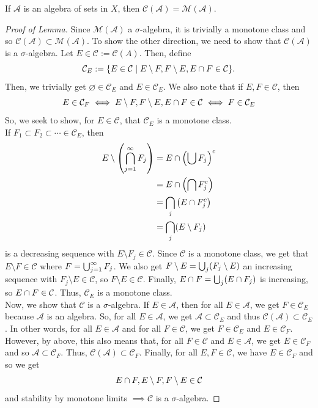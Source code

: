 \documentclass[11pt,leqno,oneside]{amsbook}
\numberwithin{thm}{section}
\renewcommand{\A}{\mathcal{A}} %
\newcommand{\M}{\mathcal{M}} %
\newcommand{\cC}{\mathcal{C}} %
\newcommand{\s}{$\sigma$-} %
\renewcommand{\emptyset}{\varnothing}
\begin{document}
\begin{lem}
  If \(\A\) is an algebra of sets in \(X\), then \(\cC(\A) = \M(\A)\).
\end{lem}
\begin{proof}[Proof of Lemma]
  Since \(\M(\A)\) a \s algebra, it is trivially a monotone class and
  so \(\cC(\A) \subset \M(\A)\). To show the other direction, we need
  to show that \(\cC(\A)\) is a \s algebra. Let \(E \in \cC :=
  \cC(A)\). Then, define \[
    \cC_E := \{E \in \cC \st E \setminus F, F \setminus E, E
    \intersect F \in \cC\}.
  \]
  Then, we trivially get \(\emptyset \in \cC_E\) and \(E \in
  \cC_E\). We also note that if \(E,F \in \cC\), then \[
    E \in \cC_F \iff E \setminus F, F \setminus E, E \intersect F \in
    \cC \iff F \in \cC_E
  \]
  So, we seek to show, for \(E \in \cC\), that \(\cC_E\) is a monotone
  class. \\

  If \(F_1 \subset F_2 \subset \cdots \in \cC_E\), then
  \begin{align*}
    E \setminus \left( \bigcap_{j=1}^\infty F_j \right)
    & = E \cap \left( \bigcup F_j \right)^c \\
    & = E \cap \left( \bigcap F_j^c \right) \\
    & = \bigcap_j \left( E \cap F_j^c \right) \\
    & = \bigcap_j (E \setminus F_j)
  \end{align*}
  is a decreasing sequence with \(E \setminus F_j \in \cC\). Since
  \(\cC\) is a monotone class, we get that \(E \setminus F \in \cC\)
  where \(F = \bigcup_{j=1}^\infty F_j\). We also get \(F \setminus E =
  \bigcup_j (F_j \setminus E)\) an increasing sequence with \(F_j
  \setminus E \in \cC\), so \(F \setminus E \in \cC\). Finally, \(E
  \cap F = \bigcup_j (E \cap F_j)\) is increasing, so \(E
  \intersect F \in \cC\). Thus, \(\cC_E\) is a monotone class. \\

  Now, we show that \(\cC\) is a \s algebra. If \(E \in \A\), then
  for all \(E \in \A\), we get \(F \in
  \cC_E\) because \(\A\) is an algebra. So, for all \(E \in \A\), we
  get \(\A \subset \cC_E\) and thus \(\cC(\A) \subset \cC_E\). In
  other words, for all \(E \in \A\) and for all \(F \in \cC\), we get
  \(F \in \cC_E\) and \(E \in \cC_F\). However, by above, this also
  means that, for all \(F \in \cC\) and \(E \in \A\), we get \(E \in
  \cC_F\) and so \(\A \subset \cC_F\). Thus, \(\cC(\A) \subset
  \cC_F\). Finally, for all \(E,F \in \cC\), we have \(E \in \cC_F\)
  and so we get \[
    E \intersect F, E \setminus F, F \setminus E \in \cC
  \]
  and stability by monotone limits \(\implies \cC\) is a \s algebra.
\end{proof}
\end{document}
